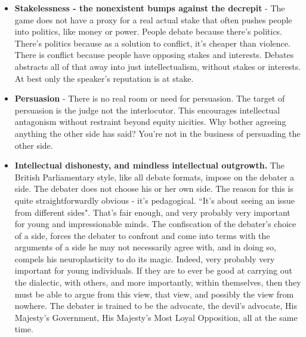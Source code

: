 \begin{itemize}
    Because adjudicators self-replicate through mentorship, feedback, and appointment to “breaking” panels, the ideological DNA of early community leaders becomes canon law. These norms propagate not via formal enforcement but prestige incentives (e.g. who gets to judge finals, give feedback, or train national teams).
    
    BP’s elite adjudicator pool has effectively ossified into a monoculture: university-educated, liberal-globalist, anti-discrimination, pro-minority, suspicious of religion, skeptical of nationalism, technocratic in outlook.

    As a result, there is no real judgement. There's only performativity.\footnote{
        It is probable that the same mechanism is responsible for the ideological capture of Common Law courts in various Common Law jurisdictions - Britain, Hong Kong, Singapore, and elsewhere. They're all 做大戲. The only exception is America, where court battles are still arguably genuine.

    }




    \item \textbf{Stakelessness - the nonexistent bumps against the decrepit} - The game does not have a proxy for a real actual stake that often pushes people into politics, like money or power. People debate because there's politics. There's politics because as a solution to conflict, it's cheaper than violence. There is conflict because people have opposing stakes and interests. Debates abstracts all of that away into just intellectualism, without stakes or interests. At best only the speaker's reputation is at stake.
    \item \textbf{Persuasion} - There is no real room or need for persuasion. The target of persuasion is the judge not the interlocutor. This encourages intellectual antagonism without restraint beyond equity nicities. Why bother agreeing anything the other side has said? You're not in the business of persuading the other side.
    \item \textbf{Intellectual dishonesty, and mindless intellectual outgrowth.} The British Parliamentary style, like all debate formats, impose on the debater a side. The debater does not choose his or her own side. The reason for this is quite straightforwardly obvious - it's pedagogical. “It's about seeing an issue from different sides". That's fair enough, and very probably very important for young and impressionable minds. The confiscation of the debater's choice of a side, forces the debater to confront and come into terms with the arguments of a side he may not necessarily agree with, and in doing so, compels his neuroplasticity to do its magic. Indeed, very probably very important for young individuals. If they are to ever be good at carrying out the dialectic, with others, and more importantly, within themselves, then they must be able to argue from this view, that view, and possibly the view from nowhere. The debater is trained to be the advocate, the devil's advocate, His Majesty's Government, His Majesty's Most Loyal Opposition, all at the same time.
    

\end{itemize}
